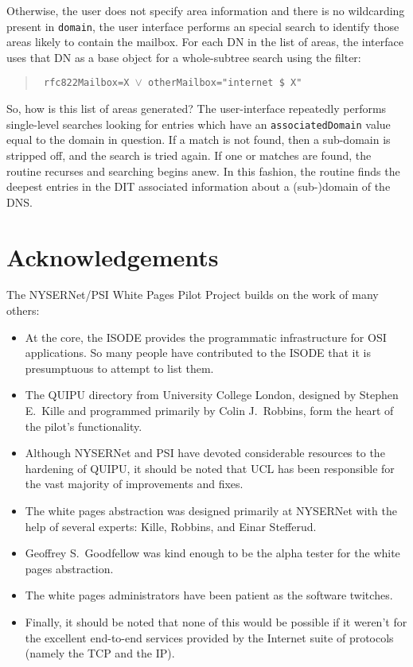 Otherwise,
the user does not specify area information and there is no wildcarding present
in \verb"domain",
the user interface performs an special search to identify those areas likely
to contain the mailbox.
For each DN in the list of areas,
the interface uses that DN as a base object for a whole-subtree search using
the filter:
\begin{quote}\small\tt
rfc822Mailbox=X $\lor$ otherMailbox="internet \$ X"
\end{quote}
So,
how is this list of areas generated?
The user-interface repeatedly performs single-level searches looking for
entries which have an \verb"associatedDomain" value equal to the domain in
question.
If a match is not found,
then a sub-domain is stripped off,
and the search is tried again.
If one or matches are found,
the routine recurses and searching begins anew.
In this fashion,
the routine finds the deepest entries in the DIT associated information about
a (sub-)domain of the DNS.

\newpage
\section	{Acknowledgements}
The NYSERNet/PSI White Pages Pilot Project builds on the work of many others:
\begin{itemize}
\item	At the core,
	the ISODE provides the programmatic infrastructure for OSI
	applications.
	So many people have contributed to the ISODE that it is presumptuous
	to attempt to list them.

\item	The QUIPU directory from University College London,
	designed by Stephen E.~Kille and programmed primarily by
	Colin J.~Robbins, form the heart of the pilot's functionality.

\item	Although NYSERNet and PSI have devoted considerable resources to the
	hardening of QUIPU,
	it should be noted that UCL has been responsible for the vast majority
	of improvements and fixes.

\item	The white pages abstraction was designed primarily at NYSERNet with
	the help of several experts: Kille, Robbins, and Einar Stefferud.

\item	Geoffrey S.~Goodfellow was kind enough to be the alpha tester for the
	white pages abstraction.

\item	The white pages administrators have been patient as the software
	twitches.

\item	Finally,
	it should be noted that none of this would be possible if it
	weren't for the excellent end-to-end services provided by the Internet
	suite of protocols (namely the TCP and the IP).
\end{itemize}

